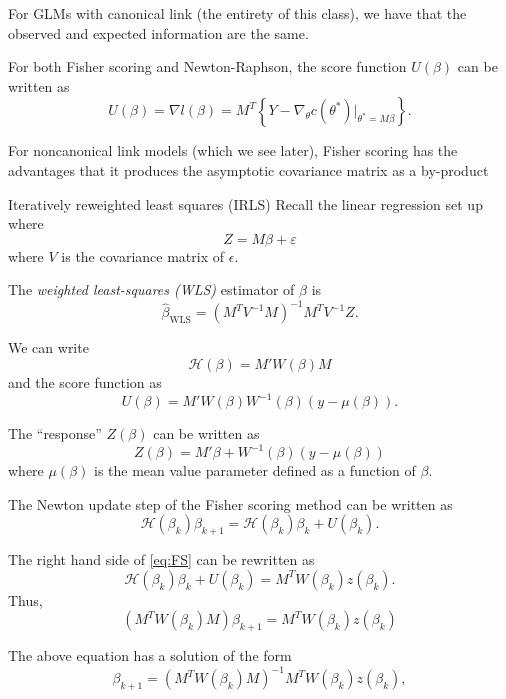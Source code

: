 \documentclass[
  ignorenonframetext,
]{beamer}
\begin{document}
\begin{frame}{}
\protect\hypertarget{section-6}{}
For GLMs with canonical link (the entirety of this class), we have that
the observed and expected information are the same.

\vspace{12pt}

For both Fisher scoring and Newton-Raphson, the score function
\(U(\beta)\) can be written as \[
  U(\beta) = \nabla l(\beta) = M^T\left\{Y - \nabla_\theta c(\theta^*)|_{\theta^* = M\beta}\right\}. 
\]

\vspace{12pt}

For noncanonical link models (which we see later), Fisher scoring has
the advantages that it produces the asymptotic covariance matrix as a
by-product
\end{frame}

\begin{frame}{Iteratively reweighted least squares (IRLS)}
\protect\hypertarget{iteratively-reweighted-least-squares-irls}{}
Recall the linear regression set up where \[
  Z = M\beta + \varepsilon
\] where \(V\) is the covariance matrix of \(\epsilon\).

\vspace{12pt}

The \emph{weighted least-squares (WLS)} estimator of \(\beta\) is \[
  \hat\beta_{\text{WLS}} = \left(M^TV^{-1}M\right)^{-1}M^TV^{-1}Z.
\]
\end{frame}

\begin{frame}{}
\protect\hypertarget{section-7}{}
We can write \[
  \mathcal{H}(\beta) = M'W(\beta)M
\] and the score function as \[
  U(\beta) = M' W(\beta) W^{-1}(\beta)(y - \mu(\beta)). 
\]

\vspace{12pt}

The ``response'' \(Z(\beta)\) can be written as \[
  Z(\beta) = M'\beta + W^{-1}(\beta)(y - \mu(\beta))
\] where \(\mu(\beta)\) is the mean value parameter defined as a
function of \(\beta\).
\end{frame}

\begin{frame}{}
\protect\hypertarget{section-8}{}
The Newton update step of the Fisher scoring method can be written as
\begin{equation} \label{eq:FS}
  \mathcal{H}(\beta_k)\beta_{k+1} = \mathcal{H}(\beta_k)\beta_k + U(\beta_k).
\end{equation}

The right hand side of \eqref{eq:FS} can be rewritten as \[
  \mathcal{H}(\beta_k)\beta_k + U(\beta_k) = M^T W(\beta_k) z(\beta_k).
\] Thus, \[
  (M^TW(\beta_k)M)\beta_{k+1} = M^T W(\beta_k) z(\beta_k)
\]

\vspace{12pt}

The above equation has a solution of the form \[
  \beta_{k+1} = (M^TW(\beta_k)M)^{-1}M^T W(\beta_k) z(\beta_k), 
\]
\end{frame}
\end{document}
